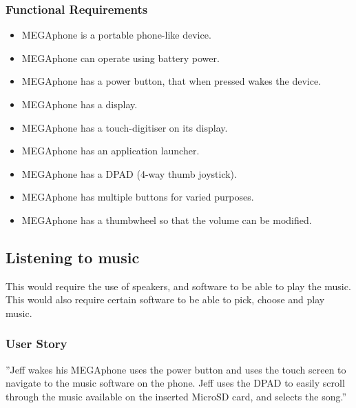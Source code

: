         \subsubsection{Functional Requirements}
        \begin{itemize}
        \item MEGAphone is a portable phone-like device.
        \item MEGAphone can operate using battery power.
        \item MEGAphone has a power button, that when pressed wakes the device.
        \item MEGAphone has a display.
        \item MEGAphone has a touch-digitiser on its display.
        \item MEGAphone has an application launcher.
        \item MEGAphone has a DPAD (4-way thumb joystick).
        \item MEGAphone has multiple buttons for varied purposes.
	\item MEGAphone has a thumbwheel so that the volume can be modified.
        \end{itemize}

\subsection{Listening to music}
	This would require the use of speakers, and software to be able to play the music. This would also require certain software to be able to pick, choose and play music.\\

	\subsubsection{User Story}
	''Jeff wakes his MEGAphone uses the power button and uses the touch screen to navigate to the music software on the phone. Jeff uses the DPAD to easily scroll through the music available on the inserted MicroSD card, and selects the song.''

